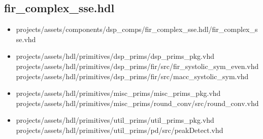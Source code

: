 \documentclass{article}
\def\comp{fir\_complex\_sse}
\begin{document}
\subsection*{\comp.hdl}
\begin{itemize}
	\item projects/assets/components/dsp\_comps/fir\_complex\_sse.hdl/fir\_complex\_sse.vhd
	\item projects/assets/hdl/primitives/dsp\_prims/dsp\_prims\_pkg.vhd
	      \subitem projects/assets/hdl/primitives/dsp\_prims/fir/src/fir\_systolic\_sym\_even.vhd
	      \subitem projects/assets/hdl/primitives/dsp\_prims/fir/src/macc\_systolic\_sym.vhd
	\item projects/assets/hdl/primitives/misc\_prims/misc\_prims\_pkg.vhd
	      \subitem projects/assets/hdl/primitives/misc\_prims/round\_conv/src/round\_conv.vhd
	\item projects/assets/hdl/primitives/util\_prims/util\_prims\_pkg.vhd
	      \subitem projects/assets/hdl/primitives/util\_prims/pd/src/peakDetect.vhd
\end{itemize}
\end{document}
